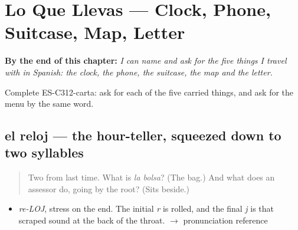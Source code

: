 
\chapter{Lo Que Llevas --- Clock, Phone, Suitcase, Map, Letter}
\label{ch:lo-que-llevas}

\begin{chapteropening}
\textbf{By the end of this chapter:} \emph{I can name and ask for the five things I travel with in Spanish: the clock, the phone, the suitcase, the map and the letter.}

Complete ES-C312-carta: ask for each of the five carried things, and ask for the menu by the same word.
\end{chapteropening}

\section[el reloj]{el reloj — the hour-teller, squeezed down to two syllables}

\label{lesson:ES-C312-reloj}



\begin{quote}
Two from last time. What is \emph{la bolsa}? (The bag.) And what does an assessor do, going by the root? (Sits beside.)
\end{quote}

\begin{sounds}
\begin{itemize}
\raggedright
  \item \emph{re-LOJ}, stress on the end. The initial \emph{r} is rolled, and the final \emph{j} is that scraped sound at the back of the throat. $\to$ pronunciation reference
\end{itemize}
\end{sounds}

